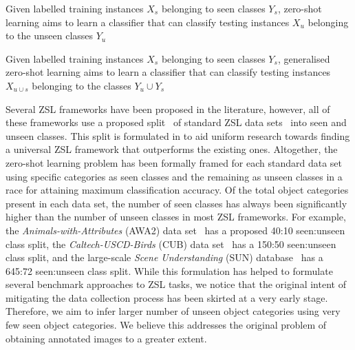 \theoremstyle{definition}
\begin{definition}
\label{def:zsl}
Given labelled training instances $X_s$ belonging to seen classes $Y_s$, zero-shot learning aims to learn a classifier that can classify testing instances $X_u$ belonging to the unseen classes $Y_u$
\end{definition}

\par
\medskip

\theoremstyle{definition}
\begin{definition}
\label{def:gzsl}
Given labelled training instances $X_s$ belonging to seen classes $Y_s$, generalised zero-shot learning aims to learn a classifier that can classify testing instances $X_{u \cup s}$ belonging to the classes $Y_u \cup  Y_s$
\end{definition}

\par
\medskip

Several ZSL frameworks have been proposed in the literature, however, all of these frameworks use a proposed split~\cite{gbu} of standard ZSL data sets~\cite{awa,cub,sun} into seen and unseen classes. This split is formulated in to aid uniform research towards finding a universal ZSL framework that outperforms the existing ones. Altogether, the zero-shot learning problem has been formally framed for each standard data set using specific categories as seen classes and the remaining as unseen classes in a race for attaining maximum classification accuracy. Of the total object categories present in each data set, the number of seen classes has always been significantly higher than the number of unseen classes in most ZSL frameworks. For example, the \textit{Animals-with-Attributes} (AWA2) data set~\cite{awa} has a proposed 40:10 seen:unseen class split, the \textit{Caltech-USCD-Birds} (CUB) data set~\cite{cub} has a 150:50 seen:unseen class split, and the large-scale \textit{Scene Understanding} (SUN) database~\cite{sun} has a 645:72 seen:unseen class split. While this formulation has helped to formulate several benchmark approaches to ZSL tasks, we notice that the original intent of mitigating the data collection process has been skirted at a very early stage. Therefore, we aim to infer larger number of unseen object categories using very few seen object categories. We believe this addresses the original problem of obtaining annotated images to a greater extent. 

